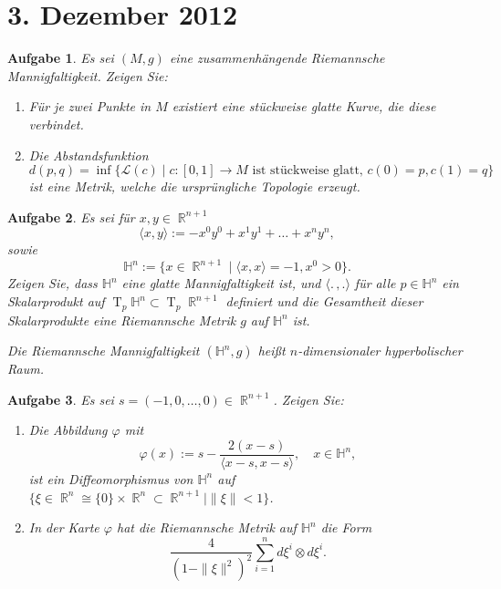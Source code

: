 \documentclass[paper=A4, twoside, chapterprefix=true, bibliography=totoc, headsepline]{scrbook}
\let\temp\phi
\let\phi\varphi
\let\varphi\temp
\let\temp\theta
\let\theta\vartheta
\let\vartheta\temp
\let\temp\epsilon
\let\epsilon\varepsilon
\let\varepsilon\temp
\let\temp\rho
\let\rho\varrho
\let\varrho\temp
\DeclareMathOperator{\R}{\mathbb{R}}
\DeclareMathOperator{\T}{T} %
\newcommand{\tensor}{\otimes}
\theoremstyle{plain}
\theoremstyle{nonumberplain}
\theoremstyle{empty}
\theoremstyle{break}
\newtheorem{Aufg}{Aufgabe}
\begin{document}

\section{3. Dezember 2012}
\setcounter{Aufg}{0} %
\setcounter{Loes}{0}

\begin{Aufg}
Es sei $(M,g)$ eine zusammenhängende Riemannsche Mannigfaltigkeit. Zeigen Sie:
\begin{enumerate}[label=\alph*),leftmargin=*,widest=b]
\item
	Für je zwei Punkte in $M$ existiert eine stückweise glatte Kurve, die diese verbindet.
\item
	Die Abstandsfunktion 
		\[d(p,q)=\inf\{\mathcal{L}(c) \mid c:[0,1] \to M \text{ ist stückweise glatt, } c(0)=p, c(1)=q\}\]
	ist eine Metrik, welche die ursprüngliche Topologie erzeugt.
\end{enumerate}\end{Aufg}

\begin{Aufg}
Es sei für $x,y\in \R^{n+1}$ 
	\[\langle x,y \rangle:= - x^0 y^0 + x^1 y^1 +\dots + x^n y^n,\]
sowie 
	\[\mathbb{H}^n:= \{x\in \R^{n+1} \mid \langle x,x \rangle =-1, x^0 > 0\}.\]
Zeigen Sie, dass $\mathbb{H}^n$ eine glatte Mannigfaltigkeit ist, und $\langle. \,, . \rangle$ für alle $p\in \mathbb{H}^n$ ein Skalarprodukt auf $\T_p \mathbb{H}^n \subset \T_p \R^{n+1}$   definiert und die Gesamtheit dieser Skalarprodukte eine Riemannsche Metrik $g$ auf $\mathbb{H}^n$ ist.

Die Riemannsche Mannigfaltigkeit $(\mathbb{H}^n, g)$ heißt \emph{$n$-dimensionaler hyperbolischer Raum}.
\end{Aufg}

\begin{Aufg}
Es sei $s=(-1,0,\dots,0) \in \R^{n+1}$. Zeigen Sie:
\begin{enumerate}[label=\alph*),leftmargin=*,widest=b]
\item
	Die Abbildung $\phi$ mit 
		\[\phi(x):=s-\frac{2 (x-s)}{\langle x-s,x-s\rangle}, \quad x\in \mathbb{H}^n, \]
	ist ein Diffeomorphismus von $\mathbb{H}^n$ auf $\{\xi \in \R^n \cong \{0\} \times \R^n\subset \R^{n+1} \mid \| \xi\|<1\}$.
\item
	In der Karte $\phi$ hat die Riemannsche Metrik auf $\mathbb{H}^n$ die Form \[ \frac{4}{(1-\|\xi \|^2)^2} \sum_{i=1}^nd\xi^i \tensor d\xi^i.\] 
\end{enumerate}\end{Aufg}
\end{document}
